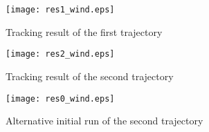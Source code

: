 \begin{figure}
\center	
\texttt{[image: res1\_wind.eps]}	
\caption{Tracking result of the first trajectory}
\label{fig:res1_wind}
\end{figure}

\begin{figure}
\center
\texttt{[image: res2\_wind.eps]}	
\caption{Tracking result of the second trajectory}
\label{fig:res2_wind}
\end{figure}

\begin{figure}
\center
\texttt{[image: res0\_wind.eps]}	
\caption{Alternative initial run of the second trajectory}
\label{fig:res3_wind}
\end{figure}